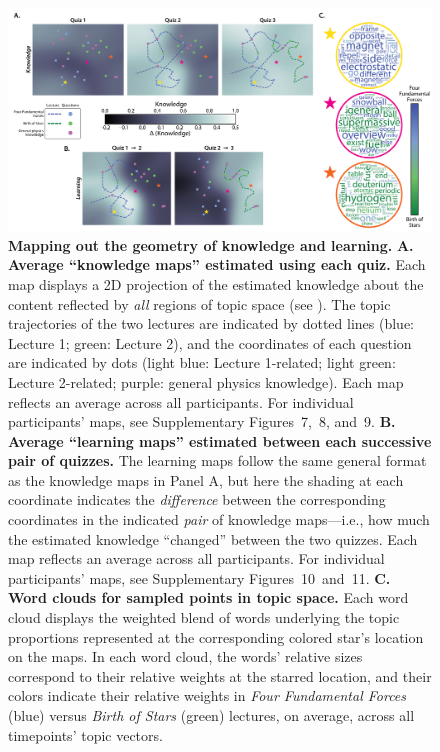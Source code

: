\documentclass[10pt]{article}
\newcommand{\individualKnowledgeMapsA}{7}
\newcommand{\individualKnowledgeMapsB}{8}
\newcommand{\individualKnowledgeMapsC}{9}
\newcommand{\individualLearningMapsA}{10}
\newcommand{\individualLearningMapsB}{11}
\renewcommand{\nameref}[1]{\mbox{\textit{\oldnameref{#1}}}}
\begin{document}
\begin{figure}[tp]
    \centering
    \includegraphics[width=\textwidth]{figs/knowledge_and_learning_maps}

    \caption{\textbf{Mapping out the geometry of knowledge and learning.}
    \textbf{A. Average ``knowledge maps'' estimated using each quiz.} Each map
    displays a 2D projection of the estimated knowledge about the content
    reflected by \textit{all} regions of topic space (see
    \nameref{subsec:knowledge-maps}). The topic trajectories of the two
    lectures are indicated by dotted lines (blue: Lecture 1; green: Lecture 2),
    and the coordinates of each question are indicated by dots (light blue:
    Lecture 1-related; light green: Lecture 2-related; purple: general physics
    knowledge). Each map reflects an average across all participants. For
    individual participants' maps, see Supplementary
    Figures~\individualKnowledgeMapsA,~\individualKnowledgeMapsB,
    and~\individualKnowledgeMapsC. \textbf{B. Average ``learning maps''
    estimated between each successive pair of quizzes.} The learning maps
    follow the same general format as the knowledge maps in Panel A, but here
    the shading at each coordinate indicates the \textit{difference} between
    the corresponding coordinates in the indicated \textit{pair} of knowledge
    maps---i.e., how much the estimated knowledge ``changed'' between the two
    quizzes. Each map reflects an average across all participants. For
    individual participants' maps, see Supplementary
    Figures~\individualLearningMapsA~and~\individualLearningMapsB. \textbf{C.
    Word clouds for sampled points in topic space.} Each word cloud displays
    the weighted blend of words underlying the topic proportions represented at
    the corresponding colored star's location on the maps. In each word cloud,
    the words' relative sizes correspond to their relative weights at the
    starred location, and their colors indicate their relative weights in
    \textit{Four Fundamental Forces} (blue) versus \textit{Birth of Stars}
    (green) lectures, on average, across all timepoints' topic vectors.}

    \label{fig:knowledge-maps}
    \end{figure}
\end{document}

